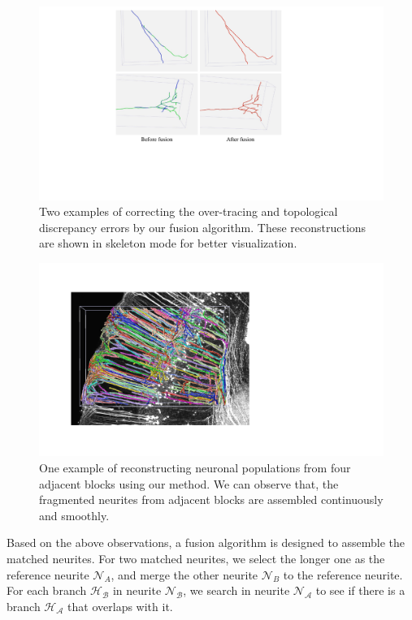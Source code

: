 \begin{figure}[t]
	\centering
	\includegraphics[width=1\columnwidth]{./Illustrations/neuorns_fusion2.pdf}
	\caption{Two examples of correcting the over-tracing and topological discrepancy errors by our fusion algorithm. These reconstructions are shown in skeleton mode for better visualization. }
	\label{fig:overlap_discrepancy}
\end{figure}

\begin{figure}[t]
	\centering
	\includegraphics[width=1\columnwidth]{./Illustrations/trace_four_blocks2.pdf}
	\caption{One example of reconstructing neuronal populations from four adjacent blocks using our method. We can observe that, the fragmented neurites from adjacent blocks are assembled continuously and smoothly.}
	\label{fig:reconstruct_blocks}
\end{figure}

Based on the above observations, a fusion algorithm is designed to assemble the matched neurites.
For two matched neurites, we select the longer one as the reference neurite $\mathcal{N}_A$, and merge the other neurite $\mathcal{N}_B$ to the reference neurite.
%
For each branch $\mathcal{H_B}$ in neurite $\mathcal{N_B}$, we search in neurite $\mathcal{N_A}$ to see if there is a branch $\mathcal{H_A}$ that overlaps with it.
%

